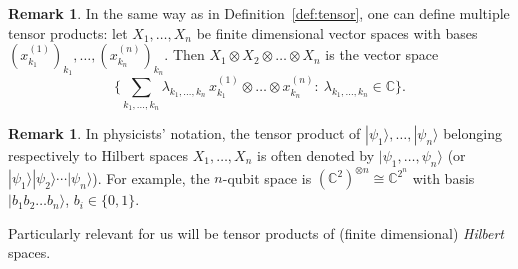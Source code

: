 \documentclass[11pt,a4paper]{article}
\numberwithin{equation}{section}
\newcommand{\C}{\mathbb{C}}
\newcommand{\ket}[1]{|#1\rangle}
\theoremstyle{plain}
\theoremstyle{definition}
\newtheorem{remark}[theorem]{Remark}
\theoremstyle{plain}
\theoremstyle{definition}
\begin{document}
\begin{remark}
In the same way as in Definition~\ref{def:tensor}, one can define multiple tensor products:
let $X_1,\dots,X_n$ be finite dimensional vector spaces with bases
$(x^{(1)}_{k_1})_{k_1},\dots,(x^{(n)}_{k_n})_{k_n}$. Then $X_1\otimes X_2\otimes\dots\otimes X_n$
is the vector space
\[
\Big\{\sum_{k_1,\dots,k_n}\lambda_{k_1,\dots,k_n}\,x^{(1)}_{k_1}\otimes\dots\otimes x^{(n)}_{k_n}:\
\lambda_{k_1,\dots,k_n}\in\C\Big\}.
\]
\end{remark}

\begin{remark}
In physicists' notation, the tensor product of $\ket{\psi_1},\dots,\ket{\psi_n}$ belonging
respectively to Hilbert spaces $X_1,\dots,X_n$ is often denoted by
$\ket{\psi_1,\dots,\psi_n}$ (or $\ket{\psi_1}\ket{\psi_2}\cdots\ket{\psi_n}$). For
example, the $n$-qubit space is $(\C^2)^{\otimes n}\cong\C^{2^n}$ with basis
$\ket{b_1b_2\dots b_n}$, $b_i\in\{0,1\}$.
\end{remark}

Particularly relevant for us will be tensor products of (finite dimensional)
\emph{Hilbert} spaces.
\end{document}
